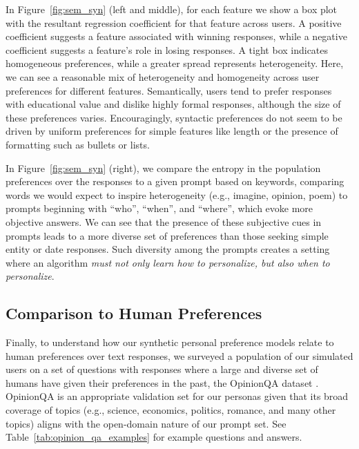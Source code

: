In Figure~\ref{fig:sem_syn} (left and middle), for each feature we show a box plot with the resultant regression coefficient for that feature across users.  A positive coefficient suggests a feature associated with winning responses, while a negative coefficient suggests a feature's role in losing responses.  A tight box indicates homogeneous preferences, while a greater spread represents heterogeneity.
Here, we can see a reasonable mix of heterogeneity and homogeneity across user preferences for different features. 
Semantically, users tend to prefer responses with educational value and dislike highly formal responses, although the size of these preferences varies.
Encouragingly, syntactic preferences do not seem to be driven by uniform preferences for simple features like length or the presence of formatting such as bullets or lists.

In Figure~\ref{fig:sem_syn} (right), we compare the entropy in the population preferences over the responses to a given prompt based on keywords, comparing words we would expect to inspire heterogeneity (e.g., imagine, opinion, poem) to prompts beginning with ``who'', ``when'', and ``where'', which evoke more objective answers.  We can see that the presence of these subjective cues in prompts leads to a more diverse set of preferences than those seeking simple entity or date responses.  Such diversity among the prompts creates a setting where an algorithm \textit{must not only learn how to personalize, but also when to personalize}.


\subsection{Comparison to Human Preferences}

Finally, to understand how our synthetic personal preference models relate to human preferences over text responses, we surveyed a population of our simulated users on a set of questions with responses where a large and diverse set of humans have given their preferences in the past, the OpinionQA dataset \citep{santurkar2023opinions}.
OpinionQA is an appropriate validation set for our personas given that its broad coverage of topics (e.g., science, economics, politics, romance, and many other topics) aligns with the open-domain nature of our prompt set.  See Table~\ref{tab:opinion_qa_examples} for example questions and answers.

